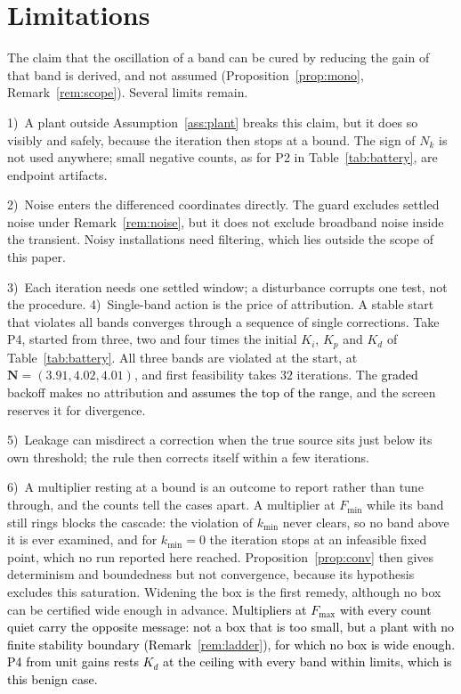 \documentclass[final,3p,times,twocolumn]{elsarticle}
\newcommand{\fix}[1]{#1}  %
\newcommand{\new}[1]{\textcolor{black}{#1}}  %
\begin{document}
\section{Limitations}
\label{sec:limits}

The claim that the oscillation of a band can be cured by reducing the
gain of that band is derived, and not assumed
(Proposition~\ref{prop:mono}, Remark~\ref{rem:scope}). Several limits
remain.

1)~\fix{A plant outside Assumption~\ref{ass:plant} breaks this claim,
but it does so visibly and safely, because the iteration then stops at a
bound. The sign of $N_k$ is not used anywhere; small negative counts, as
for P2 in Table~\ref{tab:battery}, are endpoint artifacts.}

2)~Noise enters the differenced coordinates directly. The guard
excludes settled noise under Remark~\ref{rem:noise}, but it does not
exclude broadband noise inside the transient. Noisy installations need
filtering, which lies outside the scope of this paper.

3)~Each iteration needs one settled window; a disturbance corrupts one
test, not the procedure. 4)~Single-band action is the price of
attribution. A stable start that
violates all bands converges through a sequence of single corrections.
Take P4, started from three, two and four times the initial $K_i$,
$K_p$ and $K_d$ of Table~\ref{tab:battery}. All three bands are
violated at the start, at $\mathbf N = (3.91, 4.02, 4.01)$, and first
feasibility takes $32$ iterations. The \new{graded} backoff makes no
attribution \new{and assumes the top of the range}, and the screen
reserves it for divergence.

5)~Leakage can misdirect a correction when the true source sits just
below its own threshold; the rule then corrects itself within a few
iterations.

6)~A multiplier resting at a bound is an outcome to report rather than
tune through, and the counts tell the cases apart. A multiplier at
$F_{\min}$ while its band still rings blocks the cascade: the violation
of $k_{\min}$ never clears, so no band above it is ever examined, and
for $k_{\min} = 0$ the iteration stops at an infeasible fixed point,
which no run reported here reached.
Proposition~\ref{prop:conv} then gives determinism and boundedness but
not convergence, because its hypothesis excludes this saturation.
Widening the box is the first remedy, although no box can be certified
wide enough in advance. \new{Multipliers at $F_{\max}$ with every count
quiet carry the opposite message: not a box that is too small, but a
plant with no finite stability boundary
(Remark~\ref{rem:ladder}), for which no box is wide enough. P4 from
unit gains rests $K_d$ at the ceiling with every band within limits,
which is this benign case.}
\end{document}
